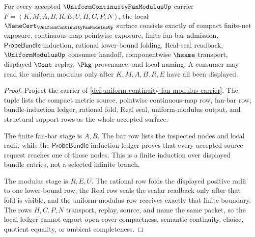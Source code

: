 \begin{theorem}
\label{thm:uniform-continuity-fan-modulus-namecert-obligations}
For every accepted $\UniformContinuityFanModulusUp$ carrier $F=(K,M,A,B,R,E,U,H,C,P,N)$, the local $\NameCert_{\UniformContinuityFanModulusUp}$ surface consists exactly of compact finite-net exposure, continuous-map pointwise exposure, finite fan-bar admission, $\mathsf{ProbeBundle}$ induction, rational lower-bound folding, Real-seal readback, $\UniformModulusUp$ consumer handoff, componentwise $\hsame$ transport, displayed $\Cont$ replay, $\Pkg$ provenance, and local naming. A consumer may read the uniform modulus only after $K,M,A,B,R,E$ have all been displayed.
\end{theorem}
\begin{proof}
Project the carrier of \autoref{def:uniform-continuity-fan-modulus-carrier}. The tuple lists the compact metric source, pointwise continuous-map row, fan-bar row, bundle-induction ledger, rational fold, Real seal, uniform-modulus output, and structural support rows as the whole accepted surface.

The finite fan-bar stage is $A,B$. The bar row lists the inspected nodes and local radii, while the $\mathsf{ProbeBundle}$ induction ledger proves that every accepted source request reaches one of those nodes. This is a finite induction over displayed bundle entries, not a selected infinite branch.

The modulus stage is $R,E,U$. The rational row folds the displayed positive radii to one lower-bound row, the Real row seals the scalar readback only after that fold is visible, and the uniform-modulus row receives exactly that finite boundary. The rows $H,C,P,N$ transport, replay, source, and name the same packet, so the local ledger cannot export open-cover compactness, semantic continuity, choice, quotient equality, or ambient completeness.
\end{proof}

